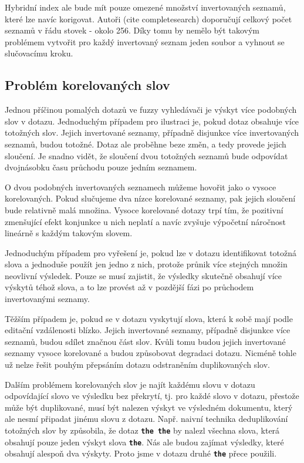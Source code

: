 \documentclass[11pt,letterpaper,oneside,openright]{book}
\newcommand{\bftt}[1]{\texttt{\textbf{#1}}}
\begin{document}

Hybridní index ale bude mít pouze omezené množství invertovaných seznamů, které
lze navíc korigovat. Autoři (cite completesearch) doporučují celkový počet
seznamů v řádu stovek - okolo 256. Díky tomu by nemělo být takovým problémem
vytvořit pro každý invertovaný seznam jeden soubor a vyhnout se slučovacímu
kroku.

\subsection{Problém korelovaných slov}
Jednou příčinou pomalých dotazů ve fuzzy vyhledávači je výskyt více podobných
slov v dotazu. Jednoduchým případem pro ilustraci je, pokud dotaz obsahuje více
totožných slov. Jejich invertované seznamy, případně disjunkce více
invertovaných seznamů, budou totožné. Dotaz ale proběhne beze změn, a tedy
provede jejich sloučení. Je snadno vidět, že sloučení dvou totožných seznamů
bude odpovídat dvojnásobku času průchodu pouze jedním seznamem.

O dvou podobných invertovaných seznamech můžeme hovořit jako o vysoce
korelovaných. Pokud slučujeme dva nízce korelované seznamy, pak jejich sloučení
bude relativně malá množina. Vysoce korelované dotazy trpí tím, že pozitivní
zmenšující efekt konjunkce u nich neplatí a navíc zvyšuje výpočetní náročnost
lineárně s každým takovým slovem.

Jednoduchým případem pro vyřešení je, pokud lze v dotazu identifikovat totožná
slova a jednoduše použít jen jedno z nich, protože průnik více stejných množin
neovlivní výsledek. Pouze se musí zajistit, že výsledky skutečně obsahují více
výskytů téhož slova, a to lze provést až v pozdější fázi po průchodem
invertovanými seznamy.

Těžším případem je, pokud se v dotazu vyskytují slova, která k sobě mají podle
editační vzdálenosti blízko. Jejich invertované seznamy, případně disjunkce
více seznamů, budou sdílet značnou část slov. Kvůli tomu budou jejich
invertované seznamy vysoce korelované a budou způsobovat degradaci dotazu.
Nicméně tohle už nelze řešit pouhým přepsáním dotazu odstraněním duplikovaných
slov.

Dalším problémem korelovaných slov je najít každému slovu v dotazu odpovídající
slovo ve výsledku bez překrytí, tj. pro každé slovo v dotazu, přestože může být
duplikované, musí být nalezen výskyt ve výsledném dokumentu, který ale nesmí
připadat jinému slovu z dotazu. Např. naivní technika deduplikování totožných
slov by způsobila, že dotaz \bftt{the the} by nalezl všechna slova, která
obsahují pouze jeden výskyt slova \bftt{the}. Nás ale budou zajímat výsledky,
které obsahují alespoň dva výskyty. Proto jsme v dotazu druhé \bftt{the} přece
použili.
\end{document}
